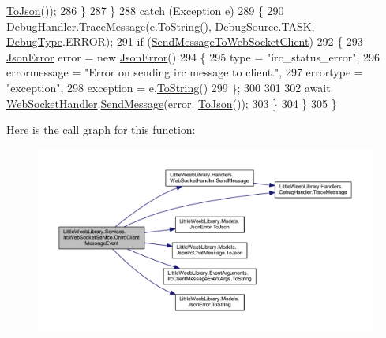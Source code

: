\begin{DoxyCode}
      \mbox{\hyperlink{class_little_weeb_library_1_1_models_1_1_json_irc_chat_message_acbac803fd5e8ecffab5335a4069fc4b4}{ToJson}}());
286                 \}
287             \}
288             \textcolor{keywordflow}{catch} (Exception e)
289             \{
290                 \mbox{\hyperlink{class_little_weeb_library_1_1_handlers_1_1_debug_handler}{DebugHandler}}.\mbox{\hyperlink{class_little_weeb_library_1_1_handlers_1_1_debug_handler_afccb37dfd6b2114af72000c2f4fe4607}{TraceMessage}}(e.ToString(), 
      \mbox{\hyperlink{namespace_little_weeb_library_1_1_handlers_a2a6ca0775121c9c503d58aa254d292be}{DebugSource}}.TASK, \mbox{\hyperlink{namespace_little_weeb_library_1_1_handlers_ab66019ed40462876ec4e61bb3ccb0a62}{DebugType}}.ERROR);
291                 \textcolor{keywordflow}{if} (\mbox{\hyperlink{class_little_weeb_library_1_1_services_1_1_irc_web_socket_service_abeb1251a64e640930814f582196f0058}{SendMessageToWebSocketClient}})
292                 \{
293                     \mbox{\hyperlink{class_little_weeb_library_1_1_models_1_1_json_error}{JsonError}} error = \textcolor{keyword}{new} \mbox{\hyperlink{class_little_weeb_library_1_1_models_1_1_json_error}{JsonError}}()
294                     \{
295                         type = \textcolor{stringliteral}{"irc\_status\_error"},
296                         errormessage = \textcolor{stringliteral}{"Error on sending irc message to client."},
297                         errortype = \textcolor{stringliteral}{"exception"},
298                         exception = e.\mbox{\hyperlink{class_little_weeb_library_1_1_models_1_1_json_error_ad7d5522c90119111d2e929f39e7f6d3c}{ToString}}()
299                     \};
300 
301 
302                     await \mbox{\hyperlink{class_little_weeb_library_1_1_handlers_1_1_web_socket_handler}{WebSocketHandler}}.\mbox{\hyperlink{class_little_weeb_library_1_1_handlers_1_1_web_socket_handler_a1de289d54d665a32c93478c68d3e6ad0}{SendMessage}}(error.
      \mbox{\hyperlink{class_little_weeb_library_1_1_models_1_1_json_error_a0e3e7dd2e2990404b7f0461742b23440}{ToJson}}());
303                 \}
304             \}
305         \}
\end{DoxyCode}
Here is the call graph for this function\+:\nopagebreak
\begin{figure}[H]
\begin{center}
\leavevmode
\includegraphics[width=350pt]{class_little_weeb_library_1_1_services_1_1_irc_web_socket_service_ab8023cd1161bcff9bebf2614764614fe_cgraph}
\end{center}
\end{figure}
